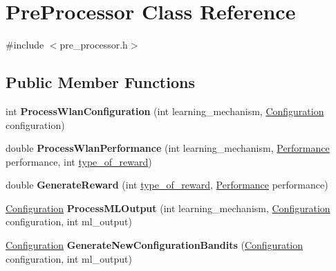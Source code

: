 \hypertarget{classPreProcessor}{}\section{Pre\+Processor Class Reference}
\label{classPreProcessor}


{\ttfamily \#include $<$pre\+\_\+processor.\+h$>$}

\subsection*{Public Member Functions}
\begin{DoxyCompactItemize}
\item 
\mbox{\label{classPreProcessor_af3e7c8f2449e69b553106203314903f0}} 
int {\bfseries Process\+Wlan\+Configuration} (int learning\+\_\+mechanism, \hyperlink{structConfiguration}{Configuration} configuration)
\item 
\mbox{\label{classPreProcessor_a2abd608c09942dfa2885e8815907f3cc}} 
double {\bfseries Process\+Wlan\+Performance} (int learning\+\_\+mechanism, \hyperlink{structPerformance}{Performance} performance, int \hyperlink{classPreProcessor_a6b837daa4f40e20f9d7bbdbd1b2ef1d2}{type\+\_\+of\+\_\+reward})
\item 
\mbox{\label{classPreProcessor_ab5d4746e7a0360611e5ef492db5ceec0}} 
double {\bfseries Generate\+Reward} (int \hyperlink{classPreProcessor_a6b837daa4f40e20f9d7bbdbd1b2ef1d2}{type\+\_\+of\+\_\+reward}, \hyperlink{structPerformance}{Performance} performance)
\item 
\mbox{\label{classPreProcessor_aa24ca9b6d851941b0654b72520fb5a81}} 
\hyperlink{structConfiguration}{Configuration} {\bfseries Process\+M\+L\+Output} (int learning\+\_\+mechanism, \hyperlink{structConfiguration}{Configuration} configuration, int ml\+\_\+output)
\item 
\mbox{\label{classPreProcessor_a1314ba4c5f3e17cdcf2f11d49f40c148}} 
\hyperlink{structConfiguration}{Configuration} {\bfseries Generate\+New\+Configuration\+Bandits} (\hyperlink{structConfiguration}{Configuration} configuration, int ml\+\_\+output)
\item 
\mbox{\label{classPreProcessor_a484b126cf65d3a2afda4eb0770276c5b}} 

\end{DoxyCompactItemize}
